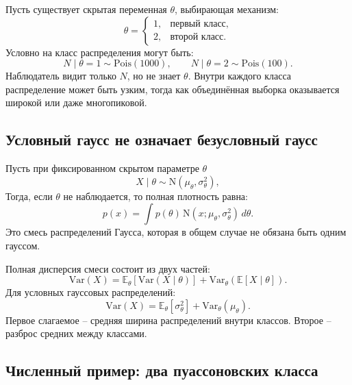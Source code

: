 \documentclass[
  russian,
  12pt,
  a4paper,
  a4paper,
  openany]{scrbook}
\begin{document}
Пусть существует скрытая переменная \(\theta\), выбирающая механизм:
\[\theta=
\begin{cases}
1, & \text{первый класс},\\
2, & \text{второй класс}.
\end{cases}\] Условно на класс распределения могут быть:
\[N\mid\theta=1\sim\mathrm{Pois}(1000),
\qquad
N\mid\theta=2\sim\mathrm{Pois}(100).\] Наблюдатель видит только \(N\),
но не знает \(\theta\). Внутри каждого класса распределение может быть
узким, тогда как объединённая выборка оказывается широкой или даже
многопиковой.

\subsection{Условный гаусс не означает безусловный
гаусс}\label{ux443ux441ux43bux43eux432ux43dux44bux439-ux433ux430ux443ux441ux441-ux43dux435-ux43eux437ux43dux430ux447ux430ux435ux442-ux431ux435ux437ux443ux441ux43bux43eux432ux43dux44bux439-ux433ux430ux443ux441ux441}

Пусть при фиксированном скрытом параметре \(\theta\) \[X\mid\theta
\sim
\mathrm{N}(\mu_\theta,\sigma_\theta^2),\] Тогда, если \(\theta\) не
наблюдается, то полная плотность равна: \[p(x)
=
\int p(\theta)\,
\mathrm{N}(x;\mu_\theta,\sigma_\theta^2)\,d\theta.\] Это смесь
распределений Гаусса, которая в общем случае не обязана быть одним
гауссом.

\begin{booknote}

Полная дисперсия смеси состоит из двух частей: \[\boxed{
\mathrm{Var}(X)
=
\mathbb{E}_\theta\!\left[\mathrm{Var}(X\mid\theta)\right]
+
\mathrm{Var}_\theta\!\left(\mathbb{E}[X\mid\theta]\right).
}\] Для условных гауссовых распределений: \[\boxed{
\mathrm{Var}(X)
=
\mathbb{E}_\theta[\sigma_\theta^2]
+
\mathrm{Var}_\theta(\mu_\theta).
}\] Первое слагаемое -- средняя ширина распределений внутри классов.
Второе -- разброс средних между классами.

\end{booknote}

\subsection{Численный пример: два пуассоновских
класса}\label{ux447ux438ux441ux43bux435ux43dux43dux44bux439-ux43fux440ux438ux43cux435ux440-ux434ux432ux430-ux43fux443ux430ux441ux441ux43eux43dux43eux432ux441ux43aux438ux445-ux43aux43bux430ux441ux441ux430}
\end{document}
